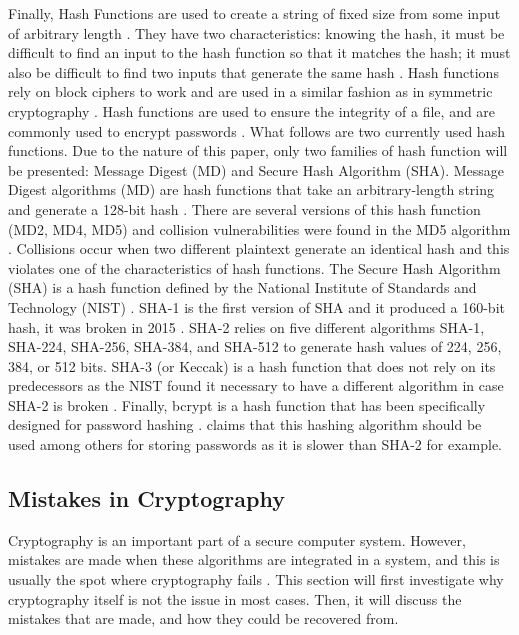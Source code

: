 \documentclass{l4proj}
\begin{document}
Finally, Hash Functions are used to create a string of fixed size from some input of arbitrary length \citep{savage_cse_2019}. 
They have two characteristics: knowing the hash, it must be difficult to find an input to the hash function so that it matches the hash;
it must also be difficult to find two inputs that generate the same hash \citep{savage_cse_2019}. 
Hash functions rely on block ciphers to work and are used in a similar fashion as in symmetric cryptography \citep{anderson_security_2008}. 
Hash functions are used to ensure the integrity of a file, and are commonly used to encrypt passwords \citep{kessler_overview_2016}. What follows are two currently used hash functions. 
Due to the nature of this paper, only two families of hash function will be presented: Message Digest (MD) and Secure Hash Algorithm (SHA).
Message Digest algorithms (MD) are hash functions that take an arbitrary-length string and generate a 128-bit hash \citep{kessler_overview_2016}.
There are several versions of this hash function (MD2, MD4, MD5) and collision vulnerabilities were found in the MD5 algorithm \citep{kessler_overview_2016}.
Collisions occur when two different plaintext generate an identical hash and this violates one of the characteristics of hash functions.
The Secure Hash Algorithm (SHA) is a hash function defined by the National Institute of Standards and Technology (NIST) \citep{kessler_overview_2016}. 
SHA-1 is the first version of SHA and it produced a 160-bit hash, it was broken in 2015 \citep{kessler_overview_2016}. SHA-2 relies on five different algorithms
SHA-1, SHA-224, SHA-256, SHA-384, and SHA-512 to generate hash values of 224, 256, 384, or 512 bits. 
SHA-3 (or Keccak) is a hash function that does not rely on its predecessors as the NIST found it necessary to have a different algorithm in case SHA-2 is broken \citep{kessler_overview_2016}.
Finally, bcrypt is a hash function that has been specifically designed for password hashing \citep{noauthor_1999_nodate}. 
\citet{savage_cse_2019-2} claims that this hashing algorithm should be used among others for storing passwords as it is slower than SHA-2 for example.

\subsection{Mistakes in Cryptography}

Cryptography is an important part of a secure computer system. However, mistakes are made when these algorithms are integrated in a system,
and this is usually the spot where cryptography fails \citep{lazar_why_nodate}. This section will first investigate why cryptography itself is not the issue in most cases.
Then, it will discuss the mistakes that are made, and how they could be recovered from.
\end{document}

